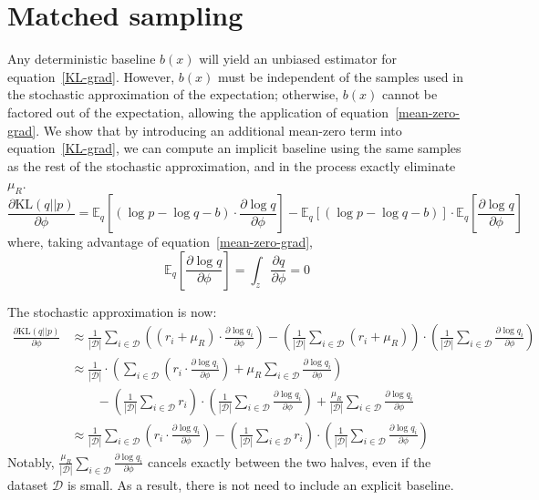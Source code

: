 \documentclass{article} %
\def\KL{\text{KL}}
\begin{document}
\section{Matched sampling} \label{matched-sampling-section}

Any deterministic baseline $b(x)$ will yield an unbiased estimator for equation~\ref{KL-grad}.  However, $b(x)$ must be independent of the samples used in the stochastic approximation of the expectation; otherwise, $b(x)$ cannot be factored out of the expectation, allowing the application of equation~\ref{mean-zero-grad}.   We show that by introducing an additional mean-zero term into equation~\ref{KL-grad}, we can compute an implicit baseline using the same samples as the rest of the stochastic approximation, and in the process exactly eliminate $\mu_R$.
\begin{equation}
\frac{\partial \KL (q || p)}{\partial \phi} = \mathbb{E}_{q} \left[ \left( \log p - \log q - b \right) \cdot \frac{ \partial \log q}{\partial \phi} \right] 
- \mathbb{E}_{q} \left[ \left( \log p - \log q - b \right) \right] \cdot \mathbb{E}_{q} \left[ \frac{ \partial \log q}{\partial \phi} \right] 
\label{matched-sampling}
\end{equation}
where, taking advantage of equation~\ref{mean-zero-grad},
\begin{equation*}
\mathbb{E}_{q} \left[ \frac{ \partial \log q}{\partial \phi} \right]  = \int_z \frac{\partial q}{\partial \phi} = 0
\end{equation*}

The stochastic approximation is now:
\begin{align}
\frac{\partial \KL(q||p)}{\partial \phi}  &\approx 
\frac{1}{|\mathcal{D}|} \sum_{i \in \mathcal{D}} \left( \left(r_i + \mu_R\right) \cdot \frac{\partial \log q_i}{\partial \phi} \right) - \left( \frac{1}{|\mathcal{D}|} \sum_{i \in \mathcal{D}} (r_i + \mu_R) \right) \cdot \left( \frac{1}{|\mathcal{D}|} \sum_{i \in \mathcal{D}} \frac{\partial \log q_i}{\partial \phi} \right) \nonumber \\
&\approx \frac{1}{|\mathcal{D}|} \cdot \left( \sum_{i \in \mathcal{D}}\left(r_i \cdot \frac{\partial \log q_i}{\partial \phi} \right) +  \mu_R \sum_{i \in \mathcal{D}} \frac{\partial \log q_i}{\partial \phi} \right) \nonumber \\
&\qquad - \left( \frac{1}{|\mathcal{D}|} \sum_{i \in \mathcal{D}} r_i \right) \cdot \left( \frac{1}{|\mathcal{D}|} \sum_{i \in \mathcal{D}} \frac{\partial \log q_i}{\partial \phi} \right) + \frac{\mu_R}{|\mathcal{D}|} \sum_{i \in \mathcal{D}} \frac{\partial \log q_i}{\partial \phi}  \nonumber \\
&\approx \frac{1}{|\mathcal{D}|} \sum_{i \in \mathcal{D}}\left( r_i \cdot \frac{\partial \log q_i}{\partial \phi} \right) - \left( \frac{1}{|\mathcal{D}|} \sum_{i \in \mathcal{D}} r_i \right) \cdot \left( \frac{1}{|\mathcal{D}|} \sum_{i \in \mathcal{D}} \frac{\partial \log q_i}{\partial \phi} \right) \label{KL-grad-matched-sampling}
\end{align}
Notably, $\frac{\mu_R}{|\mathcal{D}|} \sum_{i \in \mathcal{D}} \frac{\partial \log q_i}{\partial \phi}$ cancels exactly between the two halves, even if the dataset $\mathcal{D}$ is small.  As a result, there is not need to include an explicit baseline.  
\end{document}
